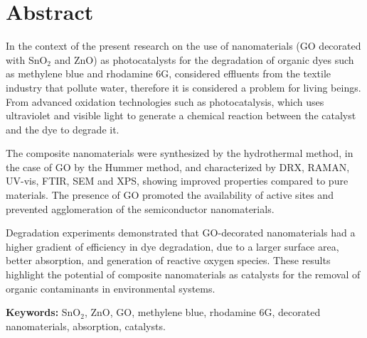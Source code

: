 \documentclass[12pt]{article}
\makeatletter
\newcommand{\listofillustrations}{%
    \section*{\listfigurename}
    \begin{itemize}
    \@starttoc{lof}
    \end{itemize}
}
\makeatother
\begin{document}
\section*{Abstract}

In the context of the present research on the use of nanomaterials (GO decorated with SnO$\displaystyle _{2}$ and ZnO) as photocatalysts for the degradation of organic dyes such as methylene blue and rhodamine 6G, considered effluents from the textile industry that pollute water, therefore it is considered a problem for living beings. From advanced oxidation technologies such as photocatalysis, which uses ultraviolet and visible light to generate a chemical reaction between the catalyst and the dye to degrade it.\vspace{1em} %

The composite nanomaterials were synthesized by the hydrothermal method, in the case of GO by the Hummer method, and characterized by DRX, RAMAN, UV-vis, FTIR, SEM and XPS, showing improved properties compared to pure materials. The presence of GO promoted the availability of active sites and prevented agglomeration of the semiconductor nanomaterials.\vspace{1em} %

Degradation experiments demonstrated that GO-decorated nanomaterials had a higher gradient of efficiency in dye degradation, due to a larger surface area, better absorption, and generation of reactive oxygen species. These results highlight the potential of composite nanomaterials as catalysts for the removal of organic contaminants in environmental systems.\vspace{1em} %

\textbf{Keywords:} SnO$\displaystyle _{2}$, ZnO, GO, methylene blue, rhodamine 6G, decorated nanomaterials, absorption, catalysts.


\newpage

\tableofcontents
\listofillustrations
\listoftables

\newpage
\newtheorem{proposition}{Proposition}
\end{document}
